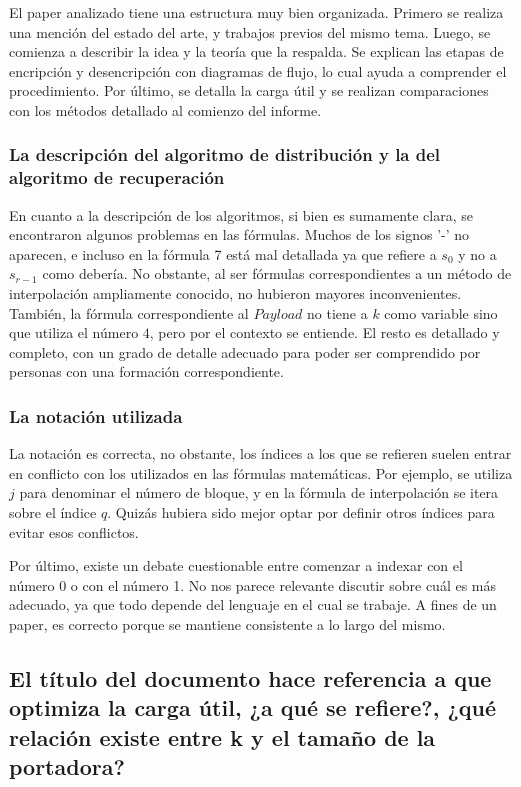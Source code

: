 \documentclass[11pt]{scrartcl} %
\begin{document}
El paper analizado tiene una estructura muy bien organizada. Primero se realiza una mención del estado del arte, y trabajos previos del mismo tema. Luego, se comienza a describir la idea y la teoría que la respalda. Se explican las etapas de encripción y desencripción con diagramas de flujo, lo cual ayuda a comprender el procedimiento. Por último, se detalla la carga útil y se realizan comparaciones con los métodos detallado al comienzo del informe.

\subsubsection{La descripción del algoritmo de distribución y la del algoritmo de recuperación}

En cuanto a la descripción de los algoritmos, si bien es sumamente clara, se encontraron algunos problemas en las fórmulas. Muchos de los signos '-' no aparecen, e incluso en la fórmula 7 está mal detallada ya que refiere a $s_{0}$ y no a $s_{r-1}$ como debería. No obstante, al ser fórmulas correspondientes a un método de interpolación ampliamente conocido, no hubieron mayores inconvenientes. También, la fórmula correspondiente al $Payload$ no tiene a $k$ como variable sino que utiliza el número $4$, pero por el contexto se entiende. El resto es detallado y completo, con un grado de detalle adecuado para poder ser comprendido por personas con una formación correspondiente.

\subsubsection{La notación utilizada}

La notación es correcta, no obstante, los índices a los que se refieren suelen entrar en conflicto con los utilizados en las fórmulas matemáticas. Por ejemplo, se utiliza $j$ para denominar el número de bloque, y en la fórmula de interpolación se itera sobre el índice $q$. Quizás hubiera sido mejor optar por definir otros índices para evitar esos conflictos.

Por último, existe un debate cuestionable entre comenzar a indexar con el número 0 o con el número 1. No nos parece relevante discutir sobre cuál es más adecuado, ya que todo depende del lenguaje en el cual se trabaje. A fines de un paper, es correcto porque se mantiene consistente a lo largo del mismo.


\subsection{El título del documento hace referencia a que optimiza la carga útil, ¿a qué se refiere?, ¿qué relación existe entre k y el tamaño de la portadora?}
\end{document}

